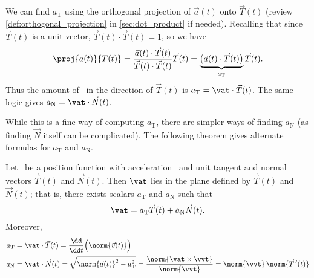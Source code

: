 We can find $a_{\mathrm{T}}$ using the orthogonal projection of $\vec a(t)$ onto $\vec T(t)$ (review \autoref{def:orthogonal_projection} in \autoref{sec:dot_product} if needed).
Recalling that since $\vec T(t)$ is a unit vector, $\vec T(t)\cdot\vec T(t)=1$, so we have 
\[\proj{a(t)}{T(t)} = \frac{\vec a(t)\cdot\vec T(t)}{\vec T(t)\cdot\vec T(t)}\vec T(t) = \underbrace{\bigl(\vec a(t)\cdot\vec T(t)\bigr)}_{a_{\mathrm{T}}}\vec T(t).\]
Thus the amount of \vat\ in the direction of $\vec T(t)$ is $a_{\mathrm{T}}=\vat\cdot\vec T(t)$. The same logic gives $a_{\mathrm{N}} = \vat\cdot\vec N(t)$.

While this is a fine way of computing $a_{\mathrm{T}}$, there are simpler ways of finding $a_{\mathrm{N}}$ (as finding $\vec N$ itself can be complicated). The following theorem gives alternate formulas for $a_{\mathrm{T}}$ and $a_{\mathrm{N}}$.


{
\begin{theorem}\label{thm:acc_plane}%
Let \vrt\ be a position function with acceleration \vat\ and unit tangent and normal vectors $\vec T(t)$ and $\vec N(t)$. Then $\vat$ lies in the plane defined by $\vec T(t)$ and $\vec N(t)$; that is, there exists scalars $a_{\mathrm{T}}$ and $a_{\mathrm{N}}$ such that
\[\vat = a_{\mathrm{T}}\vec T(t) + a_{\mathrm{N}}\vec N(t).\]
Moreover,
\begin{align*}
a_\mathrm{T} &= \vat\cdot\vec T(t) = \frac{\dd}{\dd t}\Bigl(\norm{\vec v(t)}\Bigr) \\
a_\mathrm{N} &= \vat\cdot \vec N(t) = \sqrt{\norm{\vec a(t)}^2-a_\mathrm{T}^2} = \frac{\norm{\vat\times\vvt}}{\norm{\vvt}} = \norm{\vvt}\,\norm{\vec T\,'(t)}
\end{align*}%
%
%
%
%
\end{theorem}
}


